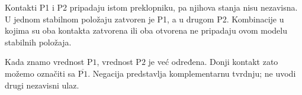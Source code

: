 
Kontakti P1 i P2 pripadaju istom preklopniku, pa njihova stanja nisu nezavisna. U jednom stabilnom položaju zatvoren je P1, a u drugom P2. Kombinacije u kojima su oba kontakta zatvorena ili oba otvorena ne pripadaju ovom modelu stabilnih položaja.

Kada znamo vrednost \(\mathrm{P1}\), vrednost \(\mathrm{P2}\) je već određena. Donji kontakt zato možemo označiti sa \(\overline{\mathrm{P1}}\). Negacija predstavlja komplementarnu tvrdnju; ne uvodi drugi nezavisni ulaz.
